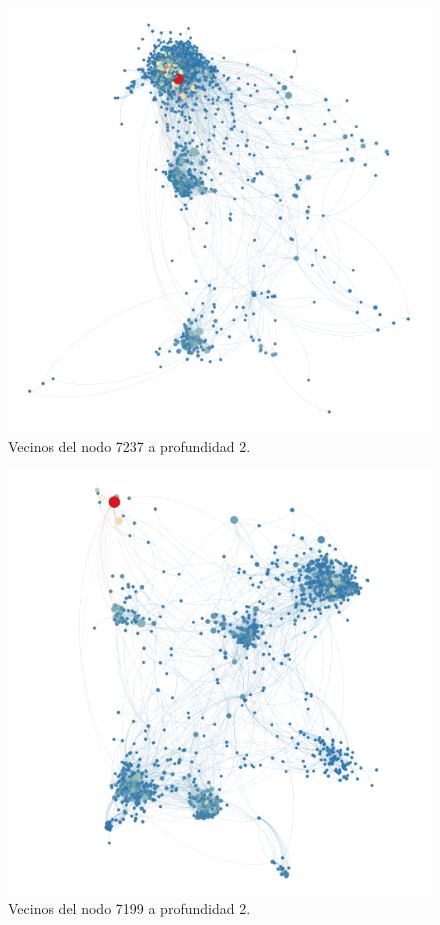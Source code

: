 \begin{figure}[H]
    \centerfloat
    \includegraphics[width=1.3\textwidth]{img/resultados/grado-vector7237-prof2.png}
    \caption{Vecinos del nodo 7237 a profundidad 2.}
\end{figure}

\begin{figure}[H]
    \centerfloat
    \includegraphics[width=1.3\textwidth]{img/resultados/grado-vector7199-prof2.png}
    \caption{Vecinos del nodo 7199 a profundidad 2.}
\end{figure}

